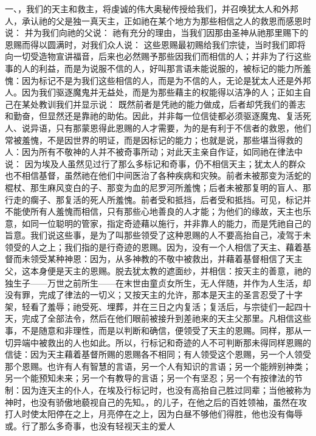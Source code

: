 一、，我们的天主和救主，将虔诚的伟大奥秘传授给我们，并召唤犹太人和外邦人，承认祂的父是独一真天主，正如祂在某个地方为那些相信之人的救恩而感恩时说： 并为我们向祂的父说： 祂有充分的理由，当我们因那由圣神从祂那里赐下的恩赐而得以圆满时，对我们众人说： 这些恩赐最初赐给我们宗徒，当时我们即将向一切受造物宣讲福音，后来也必然赐予那些因我们而相信的人；并非为了行这些事的人的利益，而是为说服不信的人，好叫那言语未能说服的，被标记的能力所羞愧：因为标记不是为我们这些相信的人，而是为不信的人，无论是犹太人还是外邦人。因为我们驱逐魔鬼并无益处，而是为那些藉主的权能得以洁净的人；正如主自己在某处教训我们并显示说： 既然前者是凭祂的能力做成，后者却凭我们的善志和勤奋，但显然还是靠祂的助佑。因此，并非每一位信徒都必须驱逐魔鬼、复活死人、说异语，只有那蒙恩得此恩赐的人才需要，为的是有利于不信者的救恩，他们常被羞愧，不是因世界的明证，而是因标记的能力；也就是说，那些堪当得救的人：因为所有不敬神的人并不被奇事所动；对此天主亲自作证，如同祂在律法中说： 因为埃及人虽然见过行了那么多标记和奇事，仍不相信天主；犹太人的群众也不相信基督，虽然祂在他们中间医治了各种疾病和灾殃。前者未被那变为活蛇的棍杖、那生麻风变白的子、那变为血的尼罗河所羞愧；后者未被那复明的盲人、那行走的瘸子、那复活的死人所羞愧。前者受和抵挡，后者受和抵挡。可见，标记并不能使所有人羞愧而相信，只有那些心地善良的人才能；为他们的缘故，天主也乐意，如同一位聪明的管家，指定奇迹藉以施行，并非靠人的能力，而是凭祂自己的旨意。我们说这些事，是为了叫那些领受了这种恩赐的人不要高抬自己，凌驾于未领受的人之上；我们指的是行奇迹的恩赐。因为，没有一个人相信了天主、藉着基督而未领受某种神恩：因为，从多神教的不敬中被救出，并藉着基督相信了天主父，这本身便是天主的恩赐。脱去犹太教的遮面纱，并相信：按天主的善意，祂的独生子——万世之前所生——在末世由童贞女所生，无人伴随，并作为人生活，却没有罪，完成了律法的一切义；又按天主的允许，那本是天主的圣言忍受了十字架，轻看了羞辱；祂受死、埋葬，并在三日之内复活；复活后，与宗徒们一起四十天，完成了全部法令，然后在他们眼前被接升到差祂来的天主父那里。凡相信这些事，不是随意和非理性，而是以判断和确信，便领受了天主的恩赐。同样，那从一切异端中被救出的人也如此。所以，行标记和奇迹的人不可判断那未得同样恩赐的信徒：因为天主藉着基督所赐的恩赐各不相同；有人领受这个恩赐，另一个人领受那个恩赐。也许有人有智慧的言语，另一个人有知识的言语；另一个能辨别神类；另一个能预知未来；另一个有教导的言语；另一个有坚忍；另一个有按律法的节制：因为连天主的仆人，在埃及行标记时，也没有高抬自己胜过同辈；当他被称为神时，也没有骄傲地藐视自己的先知。，的儿子，在他之后的百姓领袖，虽然在攻打人时使太阳停在之上，月亮停在之上，因为白昼不够他们得胜，他也没有侮辱或。行了那么多奇事，也没有轻视天主的爱人\Person